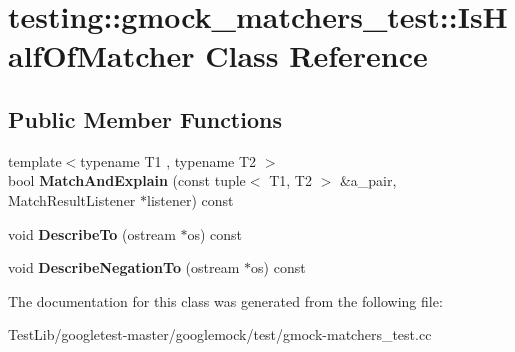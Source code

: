 \hypertarget{classtesting_1_1gmock__matchers__test_1_1IsHalfOfMatcher}{}\section{testing\+:\+:gmock\+\_\+matchers\+\_\+test\+:\+:Is\+Half\+Of\+Matcher Class Reference}
\label{classtesting_1_1gmock__matchers__test_1_1IsHalfOfMatcher}
\subsection*{Public Member Functions}
\begin{DoxyCompactItemize}
\item 
\mbox{\label{classtesting_1_1gmock__matchers__test_1_1IsHalfOfMatcher_a8c919d71f6f7e05ac76c67f37107808c}} 
{\footnotesize template$<$typename T1 , typename T2 $>$ }\\bool {\bfseries Match\+And\+Explain} (const tuple$<$ T1, T2 $>$ \&a\+\_\+pair, Match\+Result\+Listener $\ast$listener) const
\item 
\mbox{\label{classtesting_1_1gmock__matchers__test_1_1IsHalfOfMatcher_aaf62b9984288cc339599286352d82e91}} 
void {\bfseries Describe\+To} (ostream $\ast$os) const
\item 
\mbox{\label{classtesting_1_1gmock__matchers__test_1_1IsHalfOfMatcher_a759ba45c89acfa77a4e1afe95e7b768d}} 
void {\bfseries Describe\+Negation\+To} (ostream $\ast$os) const
\end{DoxyCompactItemize}


The documentation for this class was generated from the following file\+:\begin{DoxyCompactItemize}
\item 
Test\+Lib/googletest-\/master/googlemock/test/gmock-\/matchers\+\_\+test.\+cc\end{DoxyCompactItemize}
